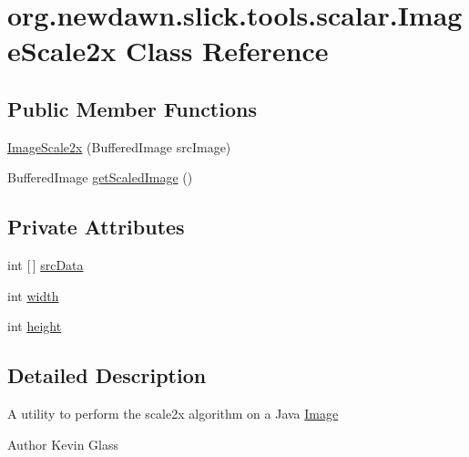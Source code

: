 \hypertarget{classorg_1_1newdawn_1_1slick_1_1tools_1_1scalar_1_1_image_scale2x}{}\section{org.\+newdawn.\+slick.\+tools.\+scalar.\+Image\+Scale2x Class Reference}
\label{classorg_1_1newdawn_1_1slick_1_1tools_1_1scalar_1_1_image_scale2x}
\subsection*{Public Member Functions}
\begin{DoxyCompactItemize}
\item 
\mbox{\hyperlink{classorg_1_1newdawn_1_1slick_1_1tools_1_1scalar_1_1_image_scale2x_a12bf7e058086627fa263f724a63bd7d1}{Image\+Scale2x}} (Buffered\+Image src\+Image)
\item 
Buffered\+Image \mbox{\hyperlink{classorg_1_1newdawn_1_1slick_1_1tools_1_1scalar_1_1_image_scale2x_a51f756038a04f55cc16c6f78e545146d}{get\+Scaled\+Image}} ()
\end{DoxyCompactItemize}
\subsection*{Private Attributes}
\begin{DoxyCompactItemize}
\item 
int \mbox{[}$\,$\mbox{]} \mbox{\hyperlink{classorg_1_1newdawn_1_1slick_1_1tools_1_1scalar_1_1_image_scale2x_a46fef900f8554bbdd22de7e816ebaef3}{src\+Data}}
\item 
int \mbox{\hyperlink{classorg_1_1newdawn_1_1slick_1_1tools_1_1scalar_1_1_image_scale2x_a026c0d00d9a8c601693fabe4771fdb1a}{width}}
\item 
int \mbox{\hyperlink{classorg_1_1newdawn_1_1slick_1_1tools_1_1scalar_1_1_image_scale2x_a06d02dc2cf0a017990d03ce89441b553}{height}}
\end{DoxyCompactItemize}


\subsection{Detailed Description}
A utility to perform the scale2x algorithm on a Java \mbox{\hyperlink{classorg_1_1newdawn_1_1slick_1_1_image}{Image}}

\begin{DoxyAuthor}{Author}
Kevin Glass 
\end{DoxyAuthor}


